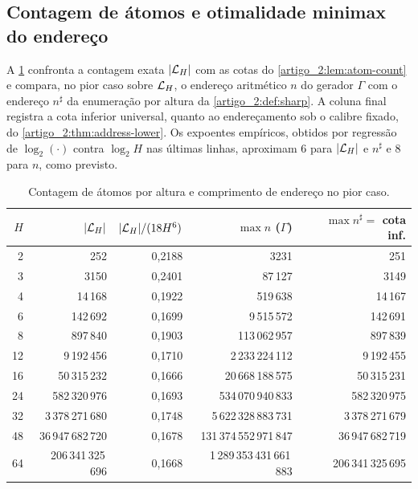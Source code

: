 \subsection{Contagem de átomos e otimalidade minimax do endereço}

A \cref{artigo_2:tab:enderecos-pt} confronta a contagem exata $|\mathcal{L}_H|$ com as cotas do
\cref{artigo_2:lem:atom-count} e compara, no pior caso sobre $\mathcal{L}_H$, o endereço
aritmético $n$ do gerador $\Gamma$ com o endereço $n^\sharp$ da enumeração por
altura da \cref{artigo_2:def:sharp}. A coluna final registra a cota inferior universal,
quanto ao endereçamento sob o calibre fixado, do
\cref{artigo_2:thm:address-lower}. Os expoentes empíricos, obtidos por regressão de
$\log_2(\cdot)$ contra $\log_2H$ nas últimas linhas, aproximam $6$ para
$|\mathcal{L}_H|$ e $n^\sharp$ e $8$ para $n$, como previsto.

\begin{table}[t]
\centering
\caption{Contagem de átomos por altura e comprimento de endereço no pior caso.}
\label{artigo_2:tab:enderecos-pt}
\small
\begin{tabular}{rrrrr}
\toprule
$H$ & $|\mathcal{L}_H|$ & $|\mathcal{L}_H|/(18H^6)$ & $\max n$ ($\Gamma$) & $\max n^\sharp=$ cota inf.\\
\midrule
2 & 252 & 0{,}2188 & 3231 & 251\\
3 & 3150 & 0{,}2401 & 87\,127 & 3149\\
4 & 14\,168 & 0{,}1922 & 519\,638 & 14\,167\\
6 & 142\,692 & 0{,}1699 & 9\,515\,572 & 142\,691\\
8 & 897\,840 & 0{,}1903 & 113\,062\,957 & 897\,839\\
12 & 9\,192\,456 & 0{,}1710 & 2\,233\,224\,112 & 9\,192\,455\\
16 & 50\,315\,232 & 0{,}1666 & 20\,668\,188\,575 & 50\,315\,231\\
24 & 582\,320\,976 & 0{,}1693 & 534\,070\,940\,833 & 582\,320\,975\\
32 & 3\,378\,271\,680 & 0{,}1748 & 5\,622\,328\,883\,731 & 3\,378\,271\,679\\
48 & 36\,947\,682\,720 & 0{,}1678 & 131\,374\,552\,971\,847 & 36\,947\,682\,719\\
64 & 206\,341\,325\,696 & 0{,}1668 & 1\,289\,353\,431\,661\,883 & 206\,341\,325\,695\\
\bottomrule
\end{tabular}

\end{table}

